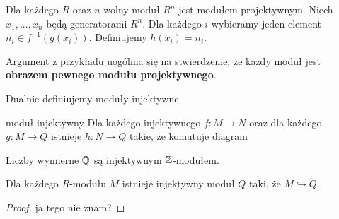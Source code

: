 \begin{example}
  Dla każdego $R$ oraz $n$ wolny moduł $R^n$ jest modułem projektywnym. Niech $x_1,..., x_n$ będą generatorami $R^n$. Dla każdego $i$ wybieramy jeden element $n_i\in f^{-1}(g(x_i))$. Definiujemy $h(x_i)=n_i$.
\end{example}

Argument z przykładu uogólnia się na stwierdzenie, że każdy moduł jest \textbf{obrazem pewnego modułu projektywnego}.

Dualnie definiujemy moduły injektywne.

\begin{definition}{moduł injektywny}{}
  Dla każdego injektywnego $f:M\to N$ oraz dla każdego $g:M\to Q$ istnieje $h:N\to Q$ takie, że komutuje diagram
  \begin{center}
  \end{center}
\end{definition}

\begin{example}
Liczby wymierne $\mathbb{Q}$ są injektywnym $\mathbb{Z}$-modułem.
\end{example}

\begin{theorem}{}{}
  Dla każdego $R$-modułu $M$ istnieje injektywny moduł $Q$ taki, że $M\hookrightarrow Q$.
\end{theorem}

\begin{proof}
  \color{red} ja tego nie znam?
\end{proof}



